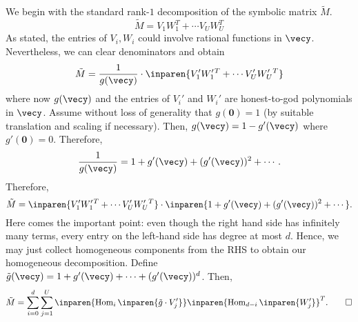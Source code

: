 We begin with the standard rank-$1$ decomposition of the symbolic matrix $\tilde{M}$.
\[
  \tilde{M} = V_1 W_1^T + \cdots V_U W_U^T
\]
As stated, the entries of $V_i,W_i$ could involve rational functions in $\vecy$. Nevertheless, we can clear denominators and obtain
\[
\tilde{M} = \frac{1}{g(\vecy)} \cdot \inparen{V'_1 W'_1{}^T + \cdots V'_U W'_U{}^T}
\]
where now $g(\vecy)$ and the entries of $V_i'$ and $W_i'$ are honest-to-god polynomials in $\vecy$. Assume without loss of generality that $g(\mathbf{0}) = 1$ (by suitable translation and scaling if necessary). Then, $g(\vecy) = 1 - g'(\vecy)$ where $g'(\mathbf{0}) = 0$. Therefore,
\[
\frac{1}{g(\vecy)} = 1 + g'(\vecy) + (g'(\vecy))^2 + \cdots . 
\]
Therefore, 
\[
  \tilde{M} = \inparen{V'_1 W'_1{}^T + \cdots V'_U W'_U{}^T} \cdot \inparen{1 + g'(\vecy) + (g'(\vecy))^2 + \cdots}.
\]
Here comes the important point: even though the right hand side has infinitely many terms, every entry on the left-hand side has degree at most $d$. Hence, we may just collect homogeneous components from the RHS to obtain our homogeneous decomposition. Define $\tilde{g}(\vecy) = 1 + g'(\vecy) + \cdots + (g'(\vecy))^d$. Then,
\[
  \tilde{M} = \sum_{i=0}^d \sum_{j=1}^U \inparen{\operatorname{Hom}_{ i}\inparen{\tilde{g} \cdot V_j'}} \inparen{\operatorname{Hom}_{d - i}\inparen{W_j'}}^T. \qed
\]


